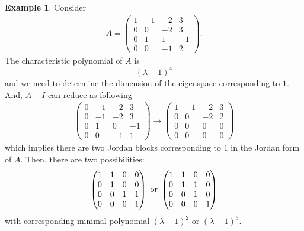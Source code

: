 \documentclass[11pt]{book}
\theoremstyle{definition}
\newtheorem{example}{Example}[section]
\numberwithin{equation}{subsection}
\begin{document}
\begin{example}
Consider
\begin{align*}
    A = \begin{pmatrix}
    1 & -1 & -2 & 3 \\
    0 & 0 & -2 & 3 \\
    0 & 1 & 1 & -1 \\
    0 & 0 & -1 & 2
    \end{pmatrix}.
\end{align*}
The characteristic polynomial of $A$ is 
$$(\lambda - 1)^4$$
and we need to determine the dimension of the eigenspace corresponding to $1$. And, $A - I$ can reduce as following
\begin{align*}
    \begin{pmatrix}
    0 & -1 & -2 & 3 \\
    0 & -1 & -2 & 3 \\
    0 & 1 & 0 & -1 \\
    0 & 0 & -1 & 1
    \end{pmatrix} \to \begin{pmatrix}
    1 & -1 & -2 & 3 \\
    0 & 0 & -2 & 2 \\
    0 & 0 & 0 & 0 \\
    0 & 0 & 0 & 0
    \end{pmatrix}
\end{align*}
which implies there are two Jordan blocks corresponding to $1$ in the Jordan form of $A$. Then, there are two possibilities:
\begin{align*}
    \begin{pmatrix}
    1 & 1 & 0 & 0 \\
    0 & 1 & 0 & 0 \\
    0 & 0 & 1 & 1 \\
    0 & 0 & 0 & 1
    \end{pmatrix}\,\, {\rm or}\,\, \begin{pmatrix}
    1 & 1 & 0 & 0 \\
    0 & 1 & 1 & 0 \\
    0 & 0 & 1 & 0 \\
    0 & 0 & 0 & 1
    \end{pmatrix}
\end{align*}
with corresponding minimal polynomial $(\lambda - 1)^2$ or $(\lambda - 1)^3$.


\end{example}
\end{document}

